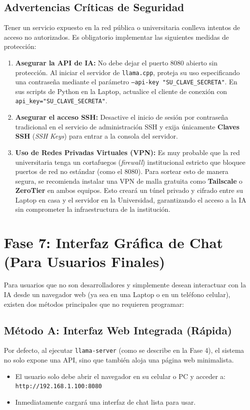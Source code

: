 \documentclass[12pt,a4paper]{article}
\begin{document}
\subsection{Advertencias Críticas de Seguridad}
Tener un servicio expuesto en la red pública o universitaria conlleva intentos de acceso no autorizados. Es obligatorio implementar las siguientes medidas de protección:
\begin{enumerate}
    \item \textbf{Asegurar la API de IA:} No debe dejar el puerto 8080 abierto sin protección. Al iniciar el servidor de \texttt{llama.cpp}, proteja su uso especificando una contraseña mediante el parámetro \texttt{--api-key "SU\_CLAVE\_SECRETA"}. En sus scripts de Python en la Laptop, actualice el cliente de conexión con \texttt{api\_key="SU\_CLAVE\_SECRETA"}.
    \item \textbf{Asegurar el acceso SSH:} Desactive el inicio de sesión por contraseña tradicional en el servicio de administración SSH y exija únicamente \textbf{Claves SSH} (\textit{SSH Keys}) para entrar a la consola del servidor.
    \item \textbf{Uso de Redes Privadas Virtuales (VPN):} Es muy probable que la red universitaria tenga un cortafuegos (\textit{firewall}) institucional estricto que bloquee puertos de red no estándar (como el 8080). Para sortear esto de manera segura, se recomienda instalar una VPN de malla gratuita como \textbf{Tailscale} o \textbf{ZeroTier} en ambos equipos. Esto creará un túnel privado y cifrado entre su Laptop en casa y el servidor en la Universidad, garantizando el acceso a la IA sin comprometer la infraestructura de la institución.
\end{enumerate}

\section{Fase 7: Interfaz Gráfica de Chat (Para Usuarios Finales)}
Para usuarios que no son desarrolladores y simplemente desean interactuar con la IA desde un navegador web (ya sea en una Laptop o en un teléfono celular), existen dos métodos principales que no requieren programar:

\subsection{Método A: Interfaz Web Integrada (Rápida)}
Por defecto, al ejecutar \texttt{llama-server} (como se describe en la Fase 4), el sistema no solo expone una API, sino que también aloja una página web minimalista.
\begin{itemize}
    \item El usuario solo debe abrir el navegador en su celular o PC y acceder a: \texttt{http://192.168.1.100:8080}
    \item Inmediatamente cargará una interfaz de chat lista para usar.
\end{itemize}
\end{document}
